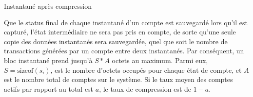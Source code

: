 \documentclass[UTF8,nofonts]{article}
\makeatletter
\newenvironment{figurehere}
 {\def\@captype{figure}}
 {}
\makeatother
\begin{document}
\begin{multicols}{2}
\begin{center}
\begin{figurehere}

\caption{Instantané après compression}
\label{fig:compact-snapshot}
\end{figurehere}
\end{center}

Que le status final de chaque instantané d'un compte est sauvegardé lors qu'il est capturé, l'état intermédiaire ne sera pas pris en compte, de sorte qu'une seule copie des données instantanés sera sauvegardée, quel que soit le nombre de transactions générées par un compte entre deux instantanés. Par conséquent, un bloc instantané prend jusqu'à $S * A$ octets au maximum. Parmi eux, $S = \text{sizeof}(s_{i})$, est le nombre d'octets occupés pour chaque état de compte, et $A$ est le nombre total de comptes sur le système. Si le taux moyen des comptes actifs par rapport au total est $a$, le taux de compression est de $1-a$.


\end{multicols}
\end{document}
